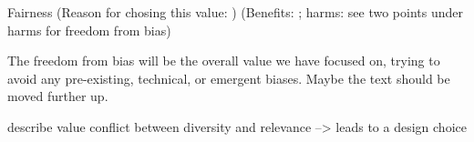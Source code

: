 Fairness (Reason for chosing this value: )				(Benefits:     ; harms: see two points under harms for freedom from bias)




The freedom from bias will be the overall value we have focused on, trying to avoid any pre-existing, technical, or emergent biases. Maybe the text should be moved further up.



describe value conflict between diversity and relevance --> leads to a design choice



